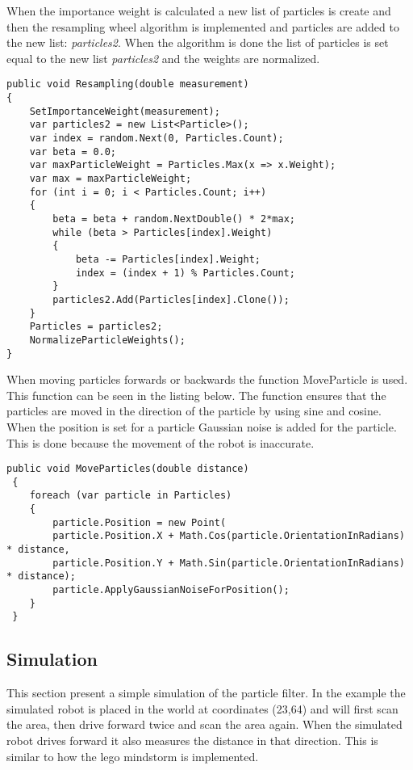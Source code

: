 When the importance weight is calculated a new list of particles is create and then the resampling wheel algorithm is implemented and particles are added to the new list: \emph{particles2}. When the algorithm is done the list of particles is set equal to the new list \emph{particles2} and the weights are normalized.

\lstset{style=sharpc}
\begin{lstlisting}[caption={Resampling wheel}, label=lst:wheel, mathescape=true]                          
public void Resampling(double measurement)
{
	SetImportanceWeight(measurement);
	var particles2 = new List<Particle>();
	var index = random.Next(0, Particles.Count);
	var beta = 0.0;
	var maxParticleWeight = Particles.Max(x => x.Weight);
	var max = maxParticleWeight;
	for (int i = 0; i < Particles.Count; i++)
	{
		beta = beta + random.NextDouble() * 2*max;
		while (beta > Particles[index].Weight)
		{
			beta -= Particles[index].Weight;
			index = (index + 1) % Particles.Count;
		}
		particles2.Add(Particles[index].Clone());
	}
	Particles = particles2;
	NormalizeParticleWeights();
}
\end{lstlisting}

When moving particles forwards or backwards the function MoveParticle is used. This function can be seen in the listing below. The function ensures that the particles are moved in the direction of the particle by using sine and cosine. When the position is set for a particle Gaussian noise is added for the particle. This is done because the movement of the robot is inaccurate. 

\lstset{style=sharpc}
\begin{lstlisting}[caption={Resampling wheel}, label=lst:wheel,  basicstyle=\tiny, mathescape=true]        
public void MoveParticles(double distance)
 {
 	foreach (var particle in Particles)
 	{
 		particle.Position = new Point(
 		particle.Position.X + Math.Cos(particle.OrientationInRadians) * distance, 
 		particle.Position.Y + Math.Sin(particle.OrientationInRadians) * distance); 
 		particle.ApplyGaussianNoiseForPosition();
 	}
 }
\end{lstlisting}

\subsection{Simulation}
This section present a simple simulation of the particle filter. In the example the simulated robot is placed in the world at coordinates (23,64) and will first scan the area, then drive forward twice and scan the area again. When the simulated robot drives forward it also measures the distance in that direction. This is similar to how the lego mindstorm is implemented.

